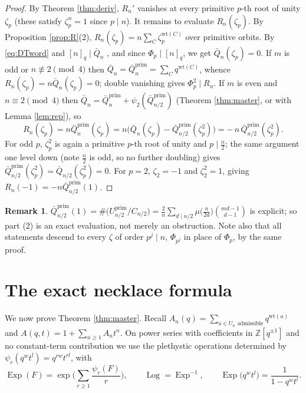 \documentclass[11pt]{amsart}
\theoremstyle{definition}
\newtheorem{remark}[theorem]{Remark}
\newcommand{\ZZ}{\mathbb{Z}}
\newcommand{\wt}{\mathrm{wt}}
\newcommand{\prim}{\mathrm{prim}}
\newcommand{\Exp}{\operatorname{Exp}}
\newcommand{\PLog}{\operatorname{Log}}
\begin{document}
\begin{proof}
By Theorem \ref{thm:deriv}, $R_n'$ vanishes at every primitive $p$-th root of unity $\zeta_p$ (these satisfy $\zeta_p^n=1$ since $p\mid n$). It remains to evaluate $R_n(\zeta_p)$. By Proposition \ref{prop:R}(2), $R_n(\zeta_p)=n\sum_C\zeta_p^{\wt(C)}$ over primitive orbits. By \eqref{eq:DTword} and $[n]_q\mid\bar Q_n$ \cite[Thm.~6.7]{Rei1102}, and since $\Phi_p\mid[n]_q$, we get $\bar Q_n(\zeta_p)=0$. If $m$ is odd or $n\not\equiv2\pmod4$ then $\bar Q_n=\bar Q^{\prim}_n=\sum_C q^{\wt(C)}$, whence $R_n(\zeta_p)=n\bar Q_n(\zeta_p)=0$; double vanishing gives $\Phi_p^2\mid R_n$. If $m$ is even and $n\equiv 2\pmod 4$ then $\bar Q_n=\bar Q^{\prim}_n+\psi_2(\bar Q^{\prim}_{n/2})$ (Theorem \ref{thm:master}, or \cite[Thm.~5.11]{Rei1102} with Lemma \ref{lem:rep}), so
\[
R_n(\zeta_p)=n\bar Q^{\prim}_n(\zeta_p)=n\big(\bar Q_n(\zeta_p)-\bar Q^{\prim}_{n/2}(\zeta_p^2)\big)=-\,n\,\bar Q^{\prim}_{n/2}(\zeta_p^2).
\]
For odd $p$, $\zeta_p^2$ is again a primitive $p$-th root of unity and $p\mid \frac n2$; the same argument one level down (note $\frac n2$ is odd, so no further doubling) gives $\bar Q^{\prim}_{n/2}(\zeta_p^2)=\bar Q_{n/2}(\zeta_p^2)=0$. For $p=2$, $\zeta_2=-1$ and $\zeta_2^2=1$, giving $R_n(-1)=-n\bar Q^{\prim}_{n/2}(1)$.
\end{proof}

\begin{remark}
$\bar Q^{\prim}_{n/2}(1)=\#\big(U^{\prim}_{n/2}/C_{n/2}\big)=\frac{2}{n}\sum_{d\mid n/2}\mu\big(\tfrac{n}{2d}\big)\binom{md-1}{d-1}$ is explicit; so part (2) is an exact evaluation, not merely an obstruction. Note also that all statements descend to every $\zeta$ of order $p^j\mid n$, $\Phi_{p^j}$ in place of $\Phi_p$, by the same proof.
\end{remark}

\section{The exact necklace formula}\label{sec:necklace}

We now prove Theorem \ref{thm:master}. Recall $A_n(q)=\sum_{a\in U_n \text{ admissible}}q^{\wt(a)}$ and $A(q,t)=1+\sum_{n\ge1}A_nt^n$. On power series with coefficients in $\ZZ[q^{\pm1}]$ and no constant-term contribution we use the plethystic operations determined by $\psi_r(q^wt^l)=q^{rw}t^{rl}$, with
\[
\Exp(F)=\exp\Big(\sum_{r\ge1}\frac{\psi_r(F)}{r}\Big),\qquad
\PLog=\Exp^{-1},\qquad
\Exp\big(q^wt^l\big)=\frac1{1-q^wt^l}.
\]
\end{document}
